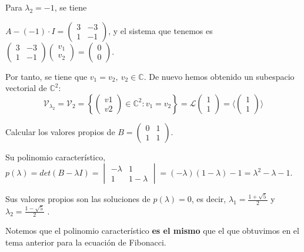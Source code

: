 \begin{ejemplo}
\begin{nlist}
     \item Para $\lambda_2 = -1$, se tiene

    $A - (-1)\cdot I =
    \begin{pmatrix}
      3 & -3 \\
      1 & -1
    \end{pmatrix}$, y el sistema que tenemos es $
    \begin{pmatrix}
      3 & -3 \\
      1 & -1
    \end{pmatrix}
    \begin{pmatrix}
      v_1 \\
      v_2
    \end{pmatrix} =
    \begin{pmatrix}
      0 \\
      0
    \end{pmatrix}.$

    Por tanto, se tiene que $v_1 = v_2,\ v_2 \in \mathbb C$. De nuevo hemos obtenido un subespacio vectorial de $\mathbb
    C^2$:  $$\mathcal V_{\lambda_2} = \mathcal V_2 = \left\{
    \begin{pmatrix}
      v1 \\
      v2
    \end{pmatrix} \in \mathbb C^2 : v_1 = v_2 \right\} = \mathscr L
    \begin{pmatrix}
      1 \\
      1
    \end{pmatrix} = \langle
    \begin{pmatrix}
      1 \\
      1
    \end{pmatrix} \rangle$$

    \end{nlist}
  \end{ejemplo}

    \begin{ejemplo}[Fibonacci]
    Calcular los valores propios de $B =
    \begin{pmatrix}
      0 & 1 \\
      1 & 1
    \end{pmatrix}$.

    Su polinomio característico, $p(\lambda) = det(B - \lambda I)
    =
    \begin{vmatrix}
      -\lambda & 1 \\
      1 & 1 - \lambda
    \end{vmatrix} = (-\lambda)(1-\lambda) - 1 = \lambda^2 - \lambda - 1$.

    Sus valores propios son las soluciones de $p(\lambda) = 0$, es decir,  $\displaystyle \lambda_1 =
    \frac{1 + \sqrt{5}}{2}$ y $\displaystyle \lambda_2 = \frac{1 - \sqrt{5}}{2}$ .

    Notemos que el polinomio característico \textbf{es el mismo} que el que obtuvimos en el tema anterior para la ecuación de Fibonacci.

  \end{ejemplo}


